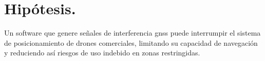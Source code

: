\chapter*{Hipótesis.}

\begin{justify}
    Un software que genere señales de interferencia \gls{gnss} puede interrumpir el sistema de posicionamiento de drones comerciales,
    limitando su capacidad de navegación y reduciendo así riesgos de uso indebido en zonas restringidas.
\end{justify}
